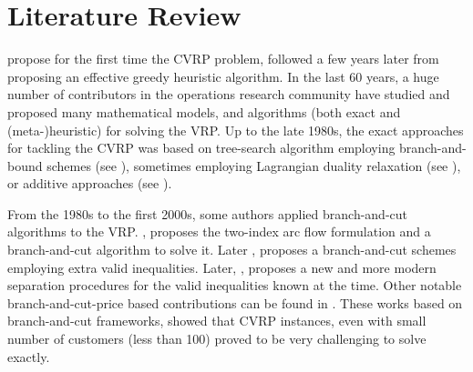 \section{Literature Review}
\label{sec:intro-literature-review}



\textcite{dantzig1959} propose for the first time the CVRP problem,
followed a few years later from \textcite{clarke1964} proposing
an effective greedy heuristic algorithm.
In the last 60 years, a huge number of contributors in
the operations research community have studied and proposed many
mathematical models, and algorithms (both exact and (meta-)heuristic)
for solving the VRP.
Up to the late 1980s, the exact approaches for tackling the CVRP was
based on tree-search algorithm employing branch-and-bound schemes
(see \textcite{christofides1969a, christofides1981, laporte1986}),
sometimes employing Lagrangian duality relaxation (see \textcite{fisher1994a, miller1995}),
or additive approaches (see \textcite{fischetti1994a, hadjiconstantinou1995}).

From the 1980s to the first 2000s, some authors applied branch-and-cut
algorithms to the VRP.
\textcite{laporte1985}, proposes the two-index arc flow formulation
and a branch-and-cut algorithm to solve it.
Later \textcite{augerat1995a}, proposes a branch-and-cut schemes
employing extra valid inequalities.
Later, \textcite{lysgaard2004}, proposes a new and more modern separation procedures for
the valid inequalities known at the time.
Other notable branch-and-cut-price based contributions
can be found in \textcite{araqueg1994, augerat1995, achuthan1996, blasum2000, ralphs2003, achuthan2003, baldacci2004}.
These works based on branch-and-cut frameworks, showed that CVRP instances, even with small number of customers (less than 100) proved
to be very challenging to solve exactly.


